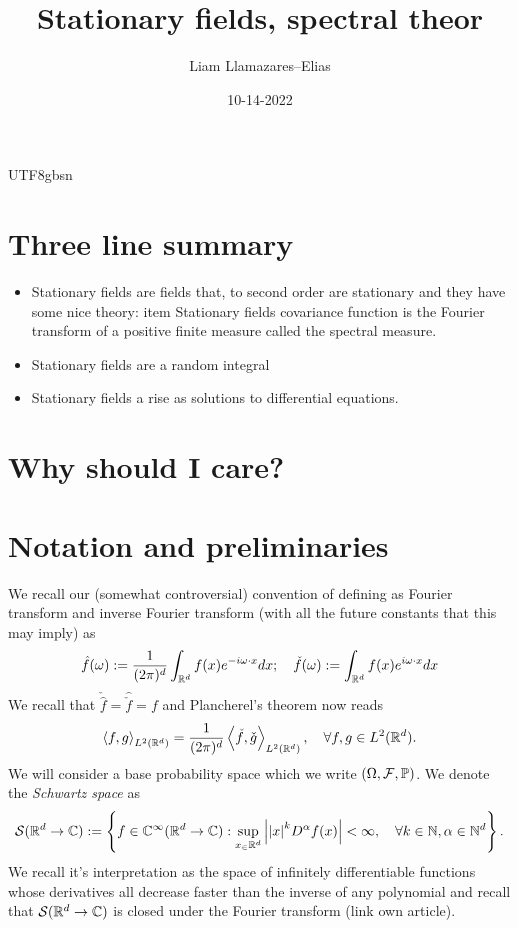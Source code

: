 \documentclass[12pt]{article}
\newcommand{\br}[1]{\left\langle#1\right\rangle}
\begin{document}
\begin{CJK*}{UTF8}{gbsn}
	\title{Stationary fields, spectral theor}
	\author{Liam Llamazares--Elias}
	\date{10-14-2022}
	\maketitle
	\section{ Three line summary }
	\begin{itemize}
		\item Stationary fields are fields that, to second order are stationary and they have some nice theory:
		      item Stationary fields covariance function is the Fourier transform of a positive finite measure called the spectral measure.
		\item Stationary fields are a random integral
		\item Stationary fields a rise as solutions to differential equations.
	\end{itemize}
	\section{Why should I care?}

	\section{Notation and preliminaries}
	We recall our (somewhat controversial) convention of defining as Fourier transform and inverse Fourier transform (with all the future constants that this may imply) as
	\begin{equation*}
		\hat{f}(\omega):=\frac{1}{(2\pi)^d}\int_{{\mathbb R}^d}f(x)e^{-i\omega\cdot x} dx;\quad \check{f}(\omega):=\int_{{\mathbb R}^d}f(x)e^{i\omega\cdot x} dx
	\end{equation*}
	We recall that $\check{\hat{f}}=\hat{\check{f}}=f$ and Plancherel's theorem now reads
	\begin{equation*}
		\br{f,g}_{L^2(\R^d)}=\frac{1}{(2\pi )^d}\br{\check{f},\check{g}}_{L^2(\R^d)}, \quad\forall f,g\in L^2(\R^d).
	\end{equation*}
	We will consider a base probability space which we write $(\Omega,\mathcal{F},\mathbb{P})$.
	We denote the \emph{Schwartz space} as
	\begin{equation*}
		{\mathcal S}({\mathbb R}^d\to\mathbb{C}):=\left\{f\in \mathbb{C}^\infty({\mathbb R}^d \to \mathbb{C}): \sup_{x_\in {\mathbb R}^d}\abs{\abs{x}^kD^\alpha f(x)}<\infty , \quad\forall k\in \mathbb{N},\alpha \in \mathbb{N}^d\right\}.
	\end{equation*}
	We recall it's interpretation as the space of infinitely differentiable functions whose derivatives all decrease faster than the inverse of any polynomial and recall that ${\mathcal S}({\mathbb R}^d\to\mathbb{C})$ is closed under the Fourier transform (link own article).


\end{CJK*}
\end{document}
